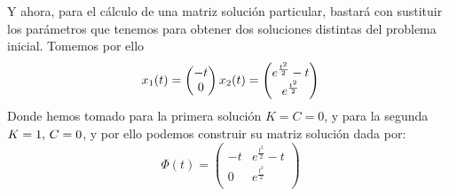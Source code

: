 \documentclass[fleqn]{article}
\begin{document}
    Y ahora, para el cálculo de una matriz solución particular, bastará con sustituir los parámetros que tenemos para obtener dos soluciones distintas del problema
    inicial. Tomemos por ello
    \begin{equation*}
        x_1(t) = 
        \begin{pmatrix}
            -t \\
            0 \\
        \end{pmatrix}\\
        x_2(t) = 
        \begin{pmatrix}
            e^{\frac{t^2}{2}} - t \\
            e^{\frac{t^2}{2}} \\
        \end{pmatrix}
    \end{equation*}
    Donde hemos tomado para la primera solución $K=C=0$, y para la segunda $K=1, \thinspace C=0 $, y por ello podemos construir su matriz solución dada por:
    $$
        \Phi (t) = 
        \begin{pmatrix}
            -t & e^{\frac{t^2}{2}} - t \\
            0 & e^{\frac{t^2}{2}} \\           
        \end{pmatrix}
    $$
\end{document}
